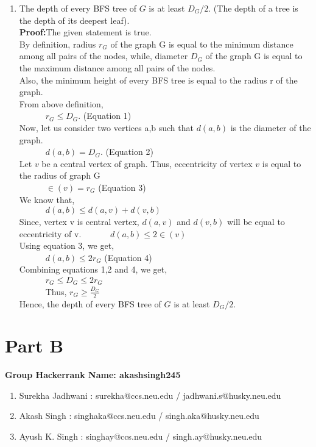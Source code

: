 \documentclass[12pt]{article}
\begin{document}
\begin{enumerate}
\begin{enumerate}
\item The depth of every BFS tree of $G$ is at least $D_G/2$. (The depth of a tree is the
depth of its deepest leaf). \\
\textbf{Proof:}The given statement is true.\\
By definition, radius $r_G$ of the graph G is equal to the minimum distance among all pairs of the nodes, while, diameter $D_G$ of the graph G is equal to the maximum distance among all pairs of the nodes.\\
Also, the minimum height of every BFS tree is equal to the radius r of the graph.\\
From above definition, \\
\verb|		|$r_G \le D_G$. \hfill (Equation 1)\\
Now, let us consider two vertices a,b such that $d(a,b)$ is the diameter of the graph.\\
\verb|		|$d(a,b) = D_G$. \hfill (Equation 2)\\
Let $v$ be a central vertex of graph. Thus, eccentricity of vertex $v$ is equal to the radius of  graph G\\
\verb|		|$\in(v) = r_G$ \hfill (Equation 3)\\
We know that,\\
\verb|		|$d(a,b) \le d(a,v) + d(v,b)$\\
Since, vertex v is central vertex, $d(a,v)$ and $d(v,b)$ will be equal to eccentricity of v.
\verb|		|$d(a,b) \le 2\in(v) $ \\
Using equation 3, we get,\\
\verb|		|$d(a,b) \le 2r_G $ \hfill (Equation 4)\\
Combining equations 1,2 and 4, we get,\\
\verb|		|$\displaystyle{r_G \le D_G \le 2r_G}$\\
\verb|		|Thus, $\displaystyle{r_G \ge \frac{D_G}{2}}$\\
Hence, the depth of every BFS tree of $G$ is at least $D_G/2$.

\end{enumerate}
\end{enumerate}
\pagebreak
\section{Part B}
\textbf{\large{Group Hackerrank Name: akashsingh245 }}
\begin{enumerate}
	\item Surekha Jadhwani : surekha@ccs.neu.edu / jadhwani.s@husky.neu.edu
	\item Akash Singh : singhaka@ccs.neu.edu / singh.aka@husky.neu.edu
	\item Ayush K. Singh : singhay@ccs.neu.edu / singh.ay@husky.neu.edu
\end{enumerate}
\end{document}

